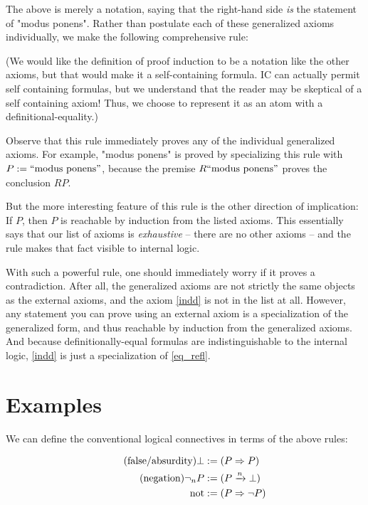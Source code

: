 \documentclass{article}
\begin{document}
  The above is merely a notation, saying that the right-hand side \emph{is} the statement of "modus ponens". Rather than postulate each of these generalized axioms individually, we make the following comprehensive rule:


  (We would like the definition of proof induction to be a notation like the other axioms, but that would make it a self-containing formula. IC can actually permit self containing formulas, but we understand that the reader may be skeptical of a self containing axiom! Thus, we choose to represent it as an atom with a definitional-equality.)
  
  Observe that this rule immediately proves any of the individual generalized axioms. For example, "modus ponens" is proved by specializing this rule with $P := \mathrm{``modus\ ponens"}$, because the premise $R\mathrm{``modus\ ponens"}$ proves the conclusion $RP$.
  
  But the more interesting feature of this rule is the other direction of implication: If $P$, then $P$ is reachable by induction from the listed axioms. This essentially says that our list of axioms is \emph{exhaustive} – there are no other axioms – and the rule makes that fact visible to internal logic.
  
With such a powerful rule, one should immediately worry if it proves a contradiction. After all, the generalized axioms are not strictly the same objects as the external axioms, and the axiom \eqref{indd} is not in the list at all. However, any statement you can prove using an external axiom is a specialization of the generalized form, and thus reachable by induction from the generalized axioms. And because definitionally-equal formulas are indistinguishable to the internal logic, \eqref{indd} is just a specialization of \eqref{eq_refl}.

  \section{Examples}\label{structure}

  We can define the conventional logical connectives in terms of the above rules:

  \setlength{\jot}{0.4em}
  \begin{align*}
    \tag{false/absurdity}
    \bot &:= (P \Rightarrow{P})\\
    \tag{negation}
    \neg_{n} P &:= ({P \xrightarrow{n} \bot})\\
    \mathrm{not} &:= (P \Rightarrow \neg P)\\
  \end{align*}
\end{document}
